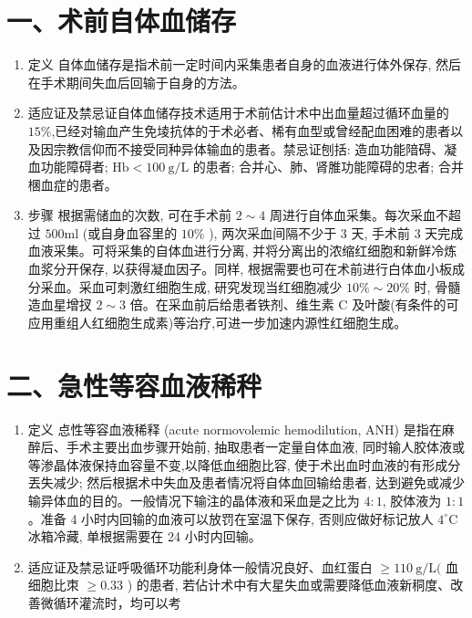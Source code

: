 \documentclass[10pt]{article}
\begin{document}
\section*{一、术前自体血储存}
\begin{enumerate}
  \item 定义 自体血储存是指术前一定时间内采集患者自身的血液进行体外保存, 然后在手术期间失血后回输于自身的方法。

  \item 适应证及禁忌证自体血储存技术适用于术前估计术中出血量超过循环血量的 $15 \%$,已经对输血产生免堎抗体的于术必者、桸有血型或曾经配血困难的患者以及因宗教信仰而不接受同种异体输血的患者。禁忌证刨括: 造血功能隌碍、凝血功能障碍者; $\mathrm{Hb}<100 \mathrm{~g} / \mathrm{L}$ 的患者; 合并心、肺、肾脽功能障碍的忠者; 合并棞血症的患者。

  \item 步骤 根据需储血的次数, 可在手术前 $2 \sim 4$ 周进行自体血采集。每次采血不超过 $500 \mathrm{ml}$ (或自身血容里的 $10 \%$ ), 两次采血间隔不少于 3 天, 手术前 3 天完成血液采集。可将采集的自体血进行分离, 并将分离出的浓缩红细胞和新鲜冷炼血浆分开保存, 以获得凝血因子。同样, 根据需要也可在术前进行白体血小板成分采血。采血可刺激红细胞生成, 研究发现当红细胞减少 $10 \% \sim 20 \%$ 时, 骨髓造血星增扠 $2 \sim 3$ 倍。在采血前后给患者铁剂、维生素 C 及叶酸(有条件的可应用重组人红细胞生成素)等治疗,可进一步加速内源性红细胞生成。

\end{enumerate}

\section*{二、急性等容血液稀秚}
\begin{enumerate}
  \item 定义 㤐性等容血液稀释 (acute normovolemic hemodilution, ANH) 是指在麻醉后、手术主要出血步骤开始前, 抽取患者一定量自体血液, 同时输人胶体液或等渗晶体液保持血容量不变,以降低血细胞比容, 使于术出血时血液的有形成分丟失减少; 然后根据术中失血及患者情况将自体血回输给患者, 达到避免或减少输异体血的目的。一般情况下输注的晶体液和采血是之比为 $4: 1$, 胶体液为 $1: 1$ 。准备 4 小时内回输的血液可以放罚在室温下保存, 否则应做好标记放人 $4^{\circ} \mathrm{C}$ 冰箱冷藏, 单根据需要在 24 小时内回输。

  \item 适应证及禁忌证呼吸循环功能利身体一般情况良好、血红蛋白 $\geqslant 110 \mathrm{~g} / \mathrm{L}($ 血细胞比朿 $\geqslant 0.33$ ) 的患者, 若佔计术中有大星失血或需要降低血液新秱度、改善微循环灌流时，均可以考

\end{enumerate}
\end{document}
